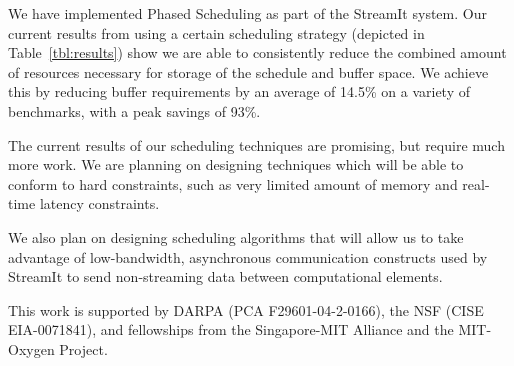 We have implemented Phased Scheduling as part of the StreamIt system.
Our current results from using a certain scheduling strategy (depicted
in Table~\ref{tbl:results}) show we are able to consistently reduce the
combined amount of resources necessary for storage of the schedule and
buffer space.  We achieve this by reducing buffer requirements by an
average of 14.5\% on a variety of benchmarks, with a peak savings of
93\%.

The current results of our scheduling techniques are promising, but
require much more work. We are planning on designing techniques which
will be able to conform to hard constraints, such as very limited amount
of memory and real-time latency constraints.

We also plan on designing scheduling algorithms that will allow us to
take advantage of low-bandwidth, asynchronous communication constructs
used by StreamIt to send non-streaming data between computational elements.

This work is supported by DARPA (PCA F29601-04-2-0166),
the NSF (CISE EIA-0071841), and fellowships from the
Singapore-MIT Alliance and the MIT-Oxygen Project.


